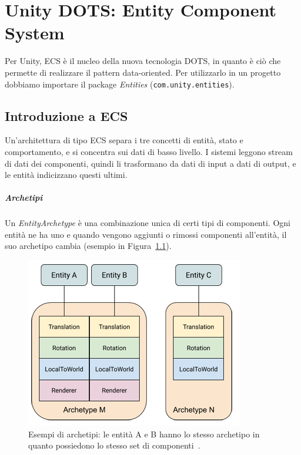 \chapter{Unity DOTS: Entity Component System}
\label{cap:ecs}

Per Unity, ECS è il nucleo della nuova tecnologia DOTS, in quanto è ciò che permette di realizzare il pattern data-oriented. Per utilizzarlo in un progetto dobbiamo importare il package \emph{Entities} (\verb|com.unity.entities|).


\section{Introduzione a ECS}

Un'architettura di tipo ECS separa i tre concetti di entità, stato e comportamento, e si concentra sui dati di basso livello. I sistemi leggono stream di dati dei componenti, quindi li trasformano da dati di input a dati di output, e le entità indicizzano questi ultimi.

\paragraph{Archetipi}

Un \emph{EntityArchetype} è una combinazione unica di certi tipi di componenti. Ogni entità ne ha uno e quando vengono aggiunti o rimossi componenti all'entità, il suo archetipo cambia (esempio in Figura~\ref{fig:archetype}).

\begin{figure}[!ht]
    \centering
    \includegraphics[width=0.60\columnwidth]{gfx/imgs/chapter2/ArchetypeDiagram.png}
    \caption{Esempi di archetipi: le entità A e B hanno lo stesso archetipo in quanto possiedono lo stesso set di componenti~\cite{doc:unity-entities-manual}.}
    \label{fig:archetype}
\end{figure}


